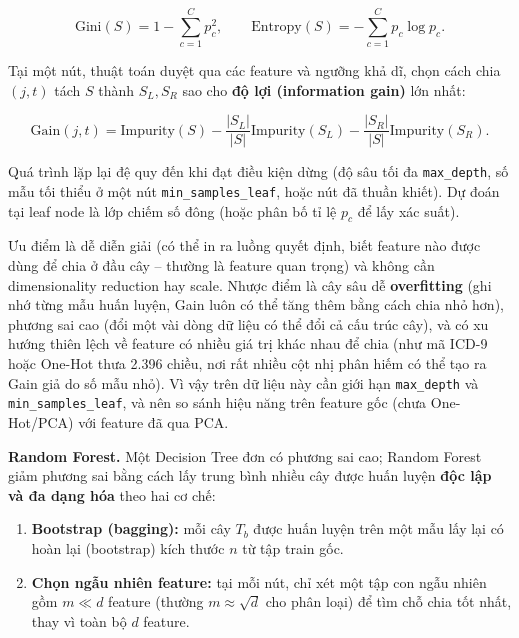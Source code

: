 \documentclass[a4paper]{report}
\begin{document}
\begin{equation}
  \text{Gini}(S) = 1 - \sum_{c=1}^{C} p_c^2, \qquad \text{Entropy}(S) = -\sum_{c=1}^{C} p_c \log p_c.
\end{equation}

Tại một nút, thuật toán duyệt qua các feature và ngưỡng khả dĩ, chọn cách chia $(j, t)$ tách $S$ thành $S_L, S_R$ sao cho \textbf{độ lợi (information gain)} lớn nhất:

\begin{equation}
  \text{Gain}(j, t) = \text{Impurity}(S) - \frac{|S_L|}{|S|}\text{Impurity}(S_L) - \frac{|S_R|}{|S|}\text{Impurity}(S_R).
\end{equation}

Quá trình lặp lại đệ quy đến khi đạt điều kiện dừng (độ sâu tối đa \texttt{max\_\allowbreak{}depth}, số mẫu tối thiểu ở một nút \texttt{min\_\allowbreak{}samples\_\allowbreak{}leaf}, hoặc nút đã thuần khiết). Dự đoán tại leaf node là lớp chiếm số đông (hoặc phân bố tỉ lệ $p_c$ để lấy xác suất).

Ưu điểm là dễ diễn giải (có thể in ra luồng quyết định, biết feature nào được dùng để chia ở đầu cây – thường là feature quan trọng) và không cần dimensionality reduction hay scale. Nhược điểm là cây sâu dễ \textbf{overfitting} (ghi nhớ từng mẫu huấn luyện, Gain luôn có thể tăng thêm bằng cách chia nhỏ hơn), phương sai cao (đổi một vài dòng dữ liệu có thể đổi cả cấu trúc cây), và có xu hướng thiên lệch về feature có nhiều giá trị khác nhau để chia (như mã ICD-9 hoặc One-Hot thưa 2.396 chiều, nơi rất nhiều cột nhị phân hiếm có thể tạo ra Gain giả do số mẫu nhỏ). Vì vậy trên dữ liệu này cần giới hạn \texttt{max\_\allowbreak{}depth} và \texttt{min\_\allowbreak{}samples\_\allowbreak{}leaf}, và nên so sánh hiệu năng trên feature gốc (chưa One-Hot/PCA) với feature đã qua PCA.

\textbf{Random Forest.} Một Decision Tree đơn có phương sai cao; Random Forest giảm phương sai bằng cách lấy trung bình nhiều cây được huấn luyện \textbf{độc lập và đa dạng hóa} theo hai cơ chế:

\begin{enumerate}
  \item \textbf{Bootstrap (bagging):} mỗi cây $T_b$ được huấn luyện trên một mẫu lấy lại có hoàn lại (bootstrap) kích thước $n$ từ tập train gốc.
  \item \textbf{Chọn ngẫu nhiên feature:} tại mỗi nút, chỉ xét một tập con ngẫu nhiên gồm $m \ll d$ feature (thường $m \approx \sqrt{d}$ cho phân loại) để tìm chỗ chia tốt nhất, thay vì toàn bộ $d$ feature.
\end{enumerate}
\end{document}
